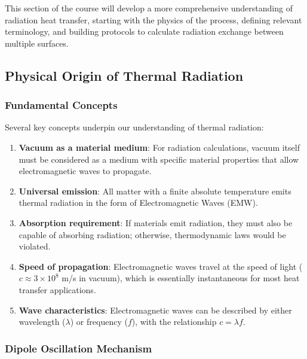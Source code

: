 This section of the course will develop a more comprehensive understanding of radiation heat transfer, starting with the physics of the process, defining relevant terminology, and building protocols to calculate radiation exchange between multiple surfaces.

\subsection*{Physical Origin of Thermal Radiation}
\subsubsection*{Fundamental Concepts}
Several key concepts underpin our understanding of thermal radiation:

\begin{enumerate}
    \item \textbf{Vacuum as a material medium}: For radiation calculations, vacuum itself must be considered as a medium with specific material properties that allow electromagnetic waves to propagate.
    
    \item \textbf{Universal emission}: All matter with a finite absolute temperature emits thermal radiation in the form of Electromagnetic Waves (EMW).
    
    \item \textbf{Absorption requirement}: If materials emit radiation, they must also be capable of absorbing radiation; otherwise, thermodynamic laws would be violated.
    
    \item \textbf{Speed of propagation}: Electromagnetic waves travel at the speed of light ($c \approx 3 \times 10^8$ m/s in vacuum), which is essentially instantaneous for most heat transfer applications.
    
    \item \textbf{Wave characteristics}: Electromagnetic waves can be described by either wavelength ($\lambda$) or frequency ($f$), with the relationship $c = \lambda f$.
\end{enumerate}

\subsubsection*{Dipole Oscillation Mechanism}

